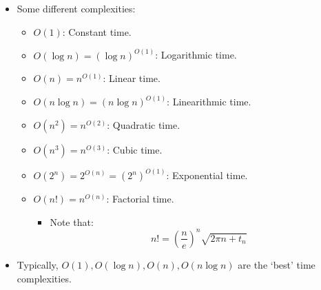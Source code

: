 \documentclass[11pt]{article}
\begin{document}
\begin{itemize}
\begin{itemize}
        \item \(f = \Omega(g) \iff \exists c > 0\) s.t. \(f(n) > c \cdot g(n)\) \(\forall (n \geq n_0) \iff \inf(\frac{f(n)}{g(n)}) > 0\)
        \item \(f = \Theta(g) \iff f = O(g) \text{ and } f = \Omega(g) \iff \exists c_1, c_2 > 0\) s.t. \(c_1 \cdot g(n) < f(n) < c_2 \cdot g(n)\) \(\forall (n \geq n_0) \iff \sup(\frac{f(n)}{g(n)}) < \infty \text{ and } \inf(\frac{f(n)}{g(n)}) > 0\)
        \item \(f = o(g) \iff \lim_{n \to \infty} \frac{f(n)}{g(n)} = 0\)
        \item Basically, after some point, \(n_0\),
        \begin{itemize}
            \item \(f = O(g)\) means \(f(n) < c \cdot g(n)\)
            \item \(f = \Omega(g)\) means \(f(n) > c \cdot g(n)\)
            \item \(f = \Theta(g)\) means \(c_1 \cdot g(n) < f(n) < c_2 \cdot g(n)\)
            \item \(f = o(g)\) means \(\lim_{n \to \infty} \frac{f(n)}{g(n)} = 0\)
        \end{itemize}
    \end{itemize}
    \item Some different complexities:
    \begin{itemize}
        \item \(O(1)\): Constant time.
        \item \(O(\log n) = (\log n)^{O(1)}\): Logarithmic time.
        \item \(O(n) = n^{O(1)}\): Linear time.
        \item \(O(n \log n) = (n \log n)^{O(1)}\): Linearithmic time.
        \item \(O(n^2) = n^{O(2)}\): Quadratic time.
        \item \(O(n^3) = n^{O(3)}\): Cubic time.
        \item \(O(2^n) = 2^{O(n)} = (2^n)^{O(1)}\): Exponential time.
        \item \(O(n!) = n^{O(n)}\): Factorial time.
        \begin{itemize}
            \item Note that:
            \[
            n! = \left( \frac{n}{e} \right)^n \sqrt{2 \pi n + t_n}
            \]
        \end{itemize}
    \end{itemize}
    \item Typically, \(O(1), O(\log n), O(n), O(n \log n)\) are the `best' time complexities.
\end{itemize}
\end{document}
